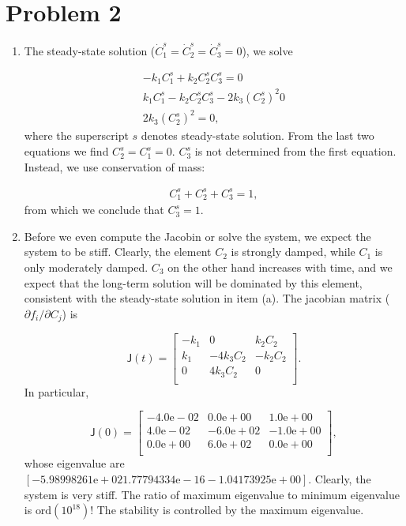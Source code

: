 \documentclass[11pt]{article}
\newcommand{\ord}{\mbox{ord}}
\newcommand{\ee}{\mathrm{e}}
\def\beq{\begin{equation}}
\def\eeq{\end{equation}}
\begin{document}
\newpage
\section*{Problem 2}

\begin{enumerate}[label=(\alph*)]

    \item The steady-state solution ($\dot C^s_1 = \dot C^s_2 = \dot C^s_3 = 0$), we solve

        \begin{align}
            -k_1 C^s_1 + k_2 C^s_2 C^s_3 = 0 \nonumber\\
            k_1 C^s_1 - k_2 C^s_2 C^s_3 - 2 k_3 (C^s_2)^2 0 \nonumber\\
            2k_3 (C^s_2)^2 =0,
        \end{align}    
        where the superscript $s$ denotes steady-state solution. From the last two equations we find $\boxed{C^s_2 = C^s_1 = 0}$. $C^s_3$ is not determined from the first equation. Instead, we use conservation of mass:

        \begin{align}
        C^s_1 + C^s_2 + C^s_3 = 1,   
        \end{align} 
        from which we conclude that $\boxed{C^s_3 = 1}$.

    \item Before we even compute the Jacobin or solve the system, we expect the system to be stiff. Clearly, the element $C_2$ is strongly damped, while $C_1$ is only moderately damped. $C_3$ on the other hand increases with time, and we expect that the long-term solution will be dominated by this element, consistent with the steady-state solution in item (a). The jacobian matrix ($\partial f_i/\partial C_j$) is

    \beq
    \label{jacobian_matrix_chem}
    \mathsf{J}(t) = 
    \begin{bmatrix*}
        -k_1 & 0 & k_2C_2 \\
        k_1 & -4k_3C_2 & -k_2C_2  \\
        0 & 4k_3C_2  & 0 \\
    \end{bmatrix*}.
    \eeq
In particular,

    \beq
    \label{jacobian_matrix_chem_0}
    \mathsf{J}(0) = 
    \begin{bmatrix*}
        -4.0\ee-02 &  0.0\ee+00 & 1.0\ee+00\\
        4.0\ee-02 & -6.0\ee+02  & -1.0\ee+00\\
        0.0\ee+00 &  6.0\ee+02  & 0.0\ee+00\\
    \end{bmatrix*},
    \eeq
    whose eigenvalue are $[-5.98998261\ee+02   1.77794334\ee-16  -1.04173925\ee+00]$. Clearly, the system is very stiff. The ratio of maximum eigenvalue to minimum eigenvalue is $\ord{(10^{18})}$! The stability is controlled by the maximum eigenvalue.


\end{enumerate}
\end{document}
